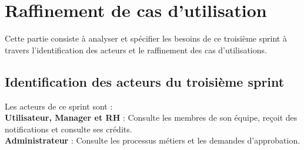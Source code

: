 \section{Raffinement de cas d'utilisation} Cette partie consiste à analyser et spécifier les besoins de ce troisième sprint à travers l’identification des acteurs et le raffinement des cas d’utilisations.
\subsection{Identification des acteurs du troisième sprint} Les acteurs de ce sprint sont : \\
    \textbf{Utilisateur, Manager et RH} : Consulte les membres de son équipe, reçoit des notifications et consulte ses crédits. \\
    \textbf{Administrateur} : Consulte les processus métiers et les demandes d’approbation. \\
